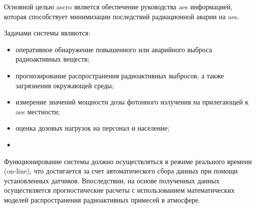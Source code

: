 Основной целью \ac{ascro} является обеспечение руководства \ac{aes} информацией, которая способствует минимизации 
последствий радиационной аварии на \ac{aes}. 

Задачами системы являются:

\begin{itemize}
	\item оперативное обнаружение повышенного или аварийного выброса радиоактивных веществ;
	\item прогнозирование распространения радиоактивных выбросов, а также загрязнения окружающей среды;
	\item измерение значений мощности дозы фотонного излучения на прилегающей к \ac{aes} местности;
	\item оценка дозовых нагрузок на персонал и население;
	\item 
\end{itemize}

Функционирование системы должно осуществляться в режиме реального времени (on-line), что достигается за счет 
автоматического сбора данных при помощи установленных датчиков. Впоследствии, на основе полученных данных осуществляется 
прогностические расчеты с использованием математических моделей распространения радиоактивных примесей в атмосфере.
